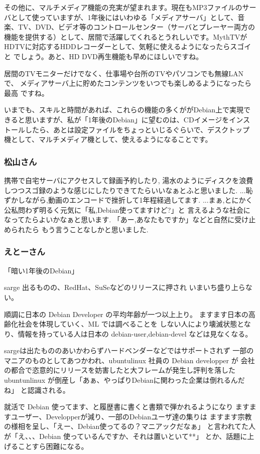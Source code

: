 \documentclass[mingoth]{jsarticle}
\begin{document}
その他に、マルチメディア機能の充実が望まれます。現在もMP3ファイルのサー
バとして使っていますが、1年後にはいわゆる「メディアサーバ」として、音
楽、TV、DVD、ビデオ等のコントロールセンター（サーバとプレーヤー両方の
機能を提供する）として、居間で活躍してくれるとうれしいです。MythTVが
HDTVに対応するHDDレコーダーとして、気軽に使えるようになったらスゴイと
でしょう。あと、HD DVD再生機能も早めにほしいですね。

居間のTVモニターだけでなく、仕事場や台所のTVやパソコンでも無線LANで、
メディアサーバ上に貯めたコンテンツをいつでも楽しめるようになったら最高
ですね。

いまでも、スキルと時間があれば、これらの機能の多くががDebian上で実現で
きると思いますが、私が「1年後のDebian」に望むのは、CDイメージをインス
トールしたら、あとは設定ファイルをちょっといじるぐらいで、デスクトップ
機として、マルチメディア機として、使えるようになることです。

\subsubsection{松山さん}
携帯で自宅サーバにアクセスして録画予約したり,
湯水のようにディスクを浪費しつつスゴ録のような感じにしたりできてたらいいなぁとふと思いました.
...恥ずかしながら,動画のエンコードで挫折して1年程経過してます.
...まぁ,とにかく公私問わず明るく元気に「私,Debian使ってますけど?」と
言えるような社会になってたらよいかなぁと思います.
「あー,あなたもですか」などと自然に受け止められたら
もう言うことなしかと思いました.

\subsubsection{えとーさん}
「暗い1年後のDebian」

sarge 出るものの、RedHat、SuSeなどのリリースに押され
いまいち盛り上らない。

順調に日本の Debian Developer の平均年齢が一つ以上上り。
ますます日本の高齢化社会を体現していく、ML では調べることを
しない人により壊滅状態となり、情報を持っている人は日本の
debian-user,debian-devel などは見なくなる。

sargeは出たもののあいかわらずハードベンダーなどではサポートされず
一部のマニアのものとしてあつかわれ、ubuntulinux 社員の Debian developper が
会社の都合で恣意的にリリースを妨害したと大フレームが発生し評判を落した 
ubuntunlinux が倒産し「あぁ、やっぱりDebianに関わった企業は倒れるんだね」
と認識される。

就活で Debian 使ってます、と履歴書に書くと書類で弾かれるようになり
ますますユーザー、Developperが減り、一部のDebianユーザ達の集りは
ますます宗教の様相を呈し、「えー、Debian使ってるの？マニアックだなぁ」
と言われてた人が「え、、、Debian 使っているんですか、それは置いといて**」
とか、話題に上げることすら困難になる。
\end{document}
